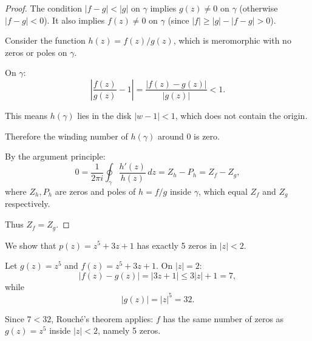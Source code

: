 \begin{center}
\end{center}

\begin{proof}
  The condition $|f - g| < |g|$ on $\gamma$ implies $g(z) \neq 0$ on $\gamma$ (otherwise $|f-g| < 0$).
  It also implies $f(z) \neq 0$ on $\gamma$ (since $|f| \geq |g| - |f-g| > 0$).

  Consider the function $h(z) = f(z)/g(z)$, which is meromorphic with no zeros or poles on $\gamma$.

  On $\gamma$:
  \[
    \left| \frac{f(z)}{g(z)} - 1 \right| = \frac{|f(z) - g(z)|}{|g(z)|} < 1.
  \]

  This means $h(\gamma)$ lies in the disk $|w - 1| < 1$, which does not contain the origin.

  Therefore the winding number of $h(\gamma)$ around $0$ is zero.

  By the argument principle:
  \[
    0 = \frac{1}{2\pi i} \oint_\gamma \frac{h'(z)}{h(z)} \, dz = Z_h - P_h = Z_f - Z_g,
  \]
  where $Z_h, P_h$ are zeros and poles of $h = f/g$ inside $\gamma$, which equal $Z_f$ and $Z_g$ respectively.

  Thus $Z_f = Z_g$.
\end{proof}

\begin{example}
  We show that $p(z) = z^5 + 3z + 1$ has exactly 5 zeros in $|z| < 2$.

  Let $g(z) = z^5$ and $f(z) = z^5 + 3z + 1$. On $|z| = 2$:
  \[
    |f(z) - g(z)| = |3z + 1| \leq 3|z| + 1 = 7,
  \]
  while
  \[
    |g(z)| = |z|^5 = 32.
  \]

  Since $7 < 32$, Rouch\'e's theorem applies: $f$ has the same number of zeros as $g(z) = z^5$ inside $|z| < 2$, namely 5 zeros.
\end{example}


